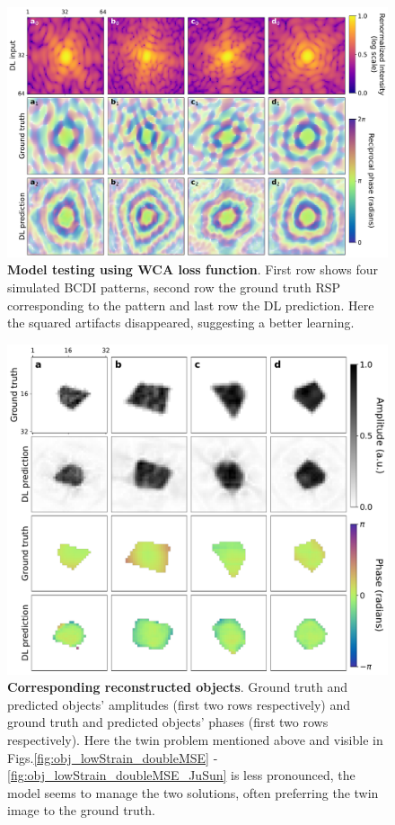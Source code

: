 \begin{figure}[H]
    \centering
    \includegraphics[width=.8\textwidth]{figures/Phasing/RSP_low_strain_VFN.pdf}
    \caption{\textbf{Model testing using WCA loss function}. First row shows four simulated BCDI patterns, second row the ground truth RSP 
    corresponding to the pattern and last row the DL prediction. Here the squared artifacts disappeared, suggesting 
    a better learning. }
    \label{fig:RSP_vfn}
\end{figure}
\begin{figure}[H]
    \centering
    \includegraphics[width=.8\textwidth]{figures/Phasing/obj_low_strain_VFN.pdf}
    \caption{\textbf{Corresponding reconstructed objects}. Ground truth and predicted objects' amplitudes (first two rows 
    respectively) and ground truth and predicted objects' phases (first two rows respectively). Here the twin problem 
    mentioned above and visible in Figs.\ref{fig:obj_lowStrain_doubleMSE} - \ref{fig:obj_lowStrain_doubleMSE_JuSun} 
    is less pronounced, the model seems to manage the two solutions, often preferring the twin image to the ground truth. }
    \label{fig:obj_vfn}
\end{figure}

